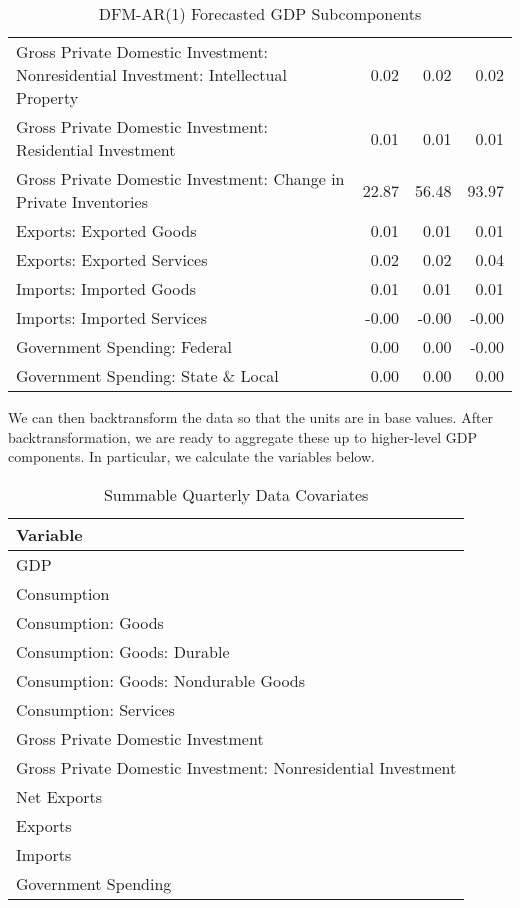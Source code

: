 \documentclass[11pt, letterpaper]{article}\usepackage[]{graphicx}\usepackage[]{color}
\begin{document}
\begin{table}[H]
\begin{tabular}{lrrr}
  Gross Private Domestic Investment: Nonresidential Investment: Intellectual Property & 0.02 & 0.02 & 0.02 \\ 
  Gross Private Domestic Investment: Residential Investment & 0.01 & 0.01 & 0.01 \\ 
  Gross Private Domestic Investment: Change in Private Inventories & 22.87 & 56.48 & 93.97 \\ 
  Exports: Exported Goods & 0.01 & 0.01 & 0.01 \\ 
  Exports: Exported Services & 0.02 & 0.02 & 0.04 \\ 
  Imports: Imported Goods & 0.01 & 0.01 & 0.01 \\ 
  Imports: Imported Services & -0.00 & -0.00 & -0.00 \\ 
  Government Spending: Federal & 0.00 & 0.00 & -0.00 \\ 
  Government Spending: State \& Local & 0.00 & 0.00 & 0.00 \\ 
   \hline
\end{tabular}
\endgroup
\caption{DFM-AR(1) Forecasted GDP Subcomponents} 
\end{table}


We can then backtransform the data so that the units are in base values. After backtransformation, we are ready to aggregate these up to higher-level GDP components. In particular, we calculate the variables below.
\begin{table}[H]
\centering
\begingroup\scriptsize
\begin{tabular}{l}
  \hline
Variable \\ 
  \hline
GDP \\ 
  Consumption \\ 
  Consumption: Goods \\ 
  Consumption: Goods: Durable \\ 
  Consumption: Goods: Nondurable Goods \\ 
  Consumption: Services \\ 
  Gross Private Domestic Investment \\ 
  Gross Private Domestic Investment: Nonresidential Investment \\ 
  Net Exports \\ 
  Exports \\ 
  Imports \\ 
  Government Spending \\ 
   \hline
\end{tabular}
\endgroup
\caption{Summable Quarterly Data Covariates} 
\end{table}
\end{document}
